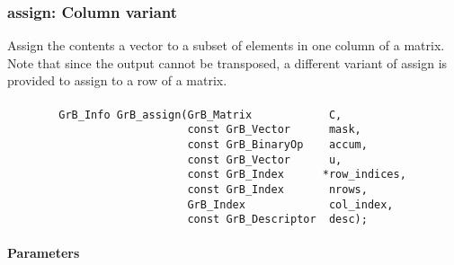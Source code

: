 \subsubsection{{\sf assign}: Column variant}

Assign the contents a vector to a subset of elements in one column of a matrix. 
Note that since the output cannot be transposed, a different variant of
{\sf assign} is provided to assign to a row of a matrix.

\paragraph{\syntax}

\begin{verbatim}
        GrB_Info GrB_assign(GrB_Matrix            C,
                            const GrB_Vector      mask,
                            const GrB_BinaryOp    accum,
                            const GrB_Vector      u,
                            const GrB_Index      *row_indices,
                            const GrB_Index       nrows,
                            GrB_Index             col_index,
                            const GrB_Descriptor  desc);
\end{verbatim}

\paragraph{Parameters}

